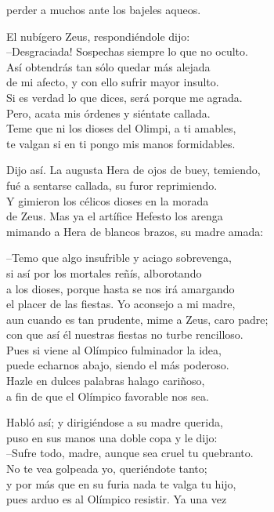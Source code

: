 perder a muchos ante los bajeles aqueos.\par
El nubígero Zeus, respondiéndole dijo:\\
--Desgraciada! Sospechas siempre lo que no oculto.\\
Así obtendrás tan sólo quedar más alejada\\
de mi afecto, y con ello sufrir mayor insulto.\\
Si es verdad lo que dices, será porque me agrada.\\
Pero, acata mis órdenes y siéntate callada.\\
Teme que ni los dioses del Olimpi, a ti amables,\\
te valgan si en ti pongo mis manos formidables.\par
Dijo así. La augusta Hera de ojos de buey, temiendo,\\
fué a sentarse callada, su furor reprimiendo.\\
Y gimieron los célicos dioses en la morada\\
de Zeus. Mas ya el artífice Hefesto los arenga\\
mimando a Hera de blancos brazos, su madre amada:\par
--Temo que algo insufrible y aciago sobrevenga,\\
si así por los mortales reñís, alborotando\\
a los dioses, porque hasta se nos irá amargando\\
el placer de las fiestas. Yo aconsejo a mi madre,\\
aun cuando es tan prudente, mime a Zeus, caro padre;\\
con que así él nuestras fiestas no turbe rencilloso.\\
Pues si viene al Olímpico fulminador la idea,\\
puede echarnos abajo, siendo el más poderoso.\\
Hazle en dulces palabras halago cariñoso,\\
a fin de que el Olímpico favorable nos sea.\par
Habló así; y dirigiéndose a su madre querida,\\
puso en sus manos una doble copa y le dijo:\\
--Sufre todo, madre, aunque sea cruel tu quebranto.\\
No te vea golpeada yo, queriéndote tanto;\\
y por más que en su furia nada te valga tu hijo,\\
pues arduo es al Olímpico resistir. Ya una vez\\
